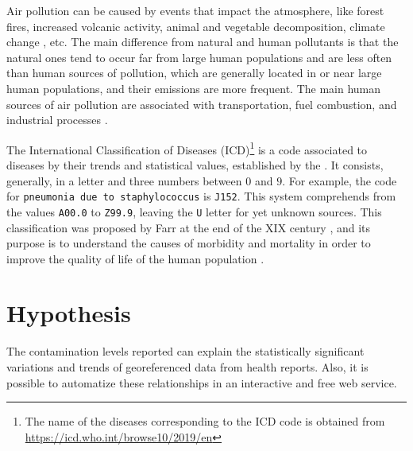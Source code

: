 \documentclass[
  11pt,
  a4paper,
  oneside
]{article}
\begin{document}
Air pollution can be caused by events that impact the atmosphere, like forest fires, increased volcanic activity, animal and vegetable decomposition, climate change \citep{jacobEA2009}, etc. The main difference from natural and human pollutants is that the natural ones tend to occur far from large human populations and are less often than human sources of pollution, which are generally located in or near large human populations, and their emissions are more frequent. The main human sources of air pollution are associated with transportation, fuel combustion, and industrial processes \citep{fenger1999}.

The International Classification of Diseases (ICD)\footnote{The name of the diseases corresponding to the ICD code is obtained from \url{https://icd.who.int/browse10/2019/en}} is a code associated to diseases by their trends and statistical values, established by the \citep{icd}. It consists, generally, in a letter and three numbers between $0$ and $9$. For example, the code for \texttt{pneumonia due to staphylococcus} is \texttt{J152}. This system comprehends from the values \texttt{A00.0} to \texttt{Z99.9}, leaving the \texttt{U} letter for yet unknown sources. This classification was proposed by Farr at the end of the XIX century \cite{who2011}, and its purpose is to understand the causes of morbidity and mortality in order to improve the quality of life of the human population \cite{who2011}.

\section{Hypothesis}
The contamination levels reported can explain the statistically significant variations and trends of georeferenced data from health reports. Also, it is possible to automatize these relationships in an interactive and free web service.
\end{document}
